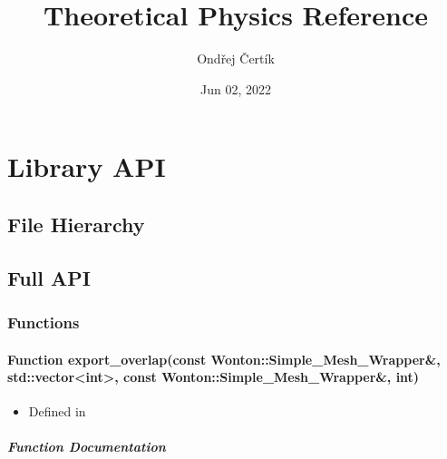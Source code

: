 \documentclass[letterpaper,10pt,english]{sphinxmanual}
\title{Theoretical Physics Reference}
\date{Jun 02, 2022}
\author{Ondřej Čertík}
\begin{document}
\pagestyle{empty}
\sphinxmaketitle
\pagestyle{plain}
\sphinxtableofcontents
\pagestyle{normal}
\label{\detokenize{index::doc}}


\sphinxstepscope


\chapter{Library API}
\label{\detokenize{api/library_root:library-api}}\label{\detokenize{api/library_root::doc}}

\section{File Hierarchy}
\label{\detokenize{api/library_root:file-hierarchy}}



\section{Full API}
\label{\detokenize{api/library_root:full-api}}

\subsection{Functions}
\label{\detokenize{api/library_root:functions}}
\sphinxstepscope


\subsubsection{Function export\_overlap(const Wonton::Simple\_Mesh\_Wrapper\&, std::vector\textless{}int\textgreater{}, const Wonton::Simple\_Mesh\_Wrapper\&, int)}
\label{\detokenize{api/function_test_8h_1a14933c87d5b3c4f31929179de3874273:function-export-overlap-const-wonton-simple-mesh-wrapper-std-vector-int-const-wonton-simple-mesh-wrapper-int}}\label{\detokenize{api/function_test_8h_1a14933c87d5b3c4f31929179de3874273:exhale-function-test-8h-1a14933c87d5b3c4f31929179de3874273}}\label{\detokenize{api/function_test_8h_1a14933c87d5b3c4f31929179de3874273::doc}}\begin{itemize}
\item {} 
\sphinxAtStartPar
Defined in 

\end{itemize}


\paragraph{Function Documentation}
\label{\detokenize{api/function_test_8h_1a14933c87d5b3c4f31929179de3874273:function-documentation}}
\end{document}

